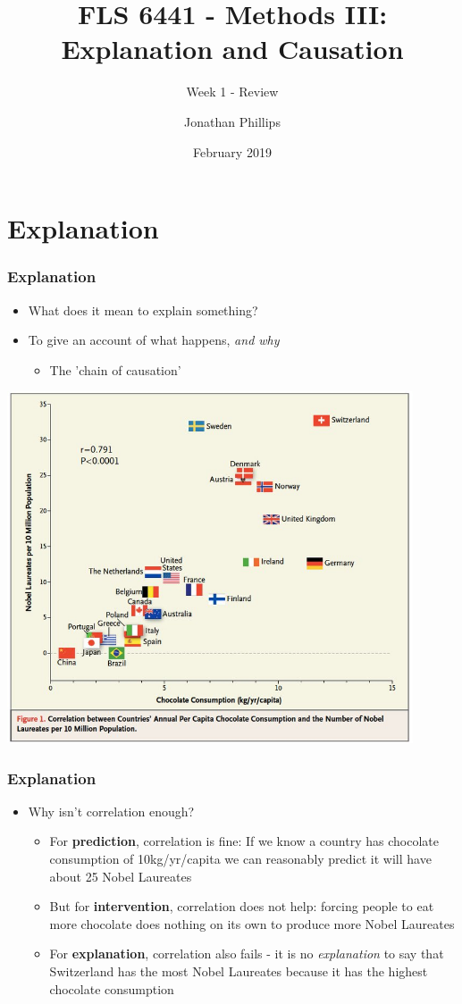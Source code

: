 \documentclass[xcolor=x11names,compress]{beamer}\usepackage[]{graphicx}\usepackage[]{color}
\title{FLS 6441 - Methods III: Explanation and Causation}
\subtitle{Week 1 - Review}
\author{Jonathan Phillips}
\date{February 2019}
\renewcommand{\(}{\begin{columns}}
\renewcommand{\)}{\end{columns}}
\newcommand{\<}[1]{\begin{column}{#1}}
\renewcommand{\>}{\end{column}}
\begin{document}
\frame{\titlepage}

\section{Explanation}

\begin{frame}
\frametitle{Explanation}
\begin{itemize}
\item What does it mean to explain something?
\pause
\item To give an account of what happens, \textit{and why}
\begin{itemize}
\item The 'chain of causation'
\end{itemize}
\end{itemize}
\end{frame}

\includegraphics[width=0.9\textwidth]{Chocolate_Nobel.jpg}

\begin{frame}
\frametitle{Explanation}
\small
\begin{itemize}
\item Why isn't correlation enough?
\pause
\begin{itemize}
\item For \textbf{prediction}, correlation is fine: If we know a country has chocolate consumption of 10kg/yr/capita we can reasonably predict it will have about 25 Nobel Laureates
\pause
\item But for \textbf{intervention}, correlation does not help: forcing people to eat more chocolate does nothing on its own to produce more Nobel Laureates
\pause
\item For \textbf{explanation}, correlation also fails - it is no \textit{explanation} to say that Switzerland has the most Nobel Laureates because it has the highest chocolate consumption
\end{itemize}
\end{itemize}
\normalsize
\end{frame}
\end{document}
